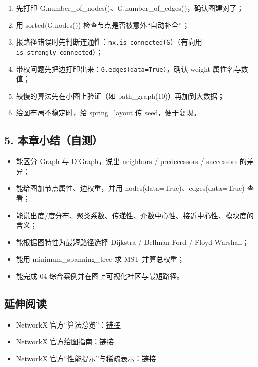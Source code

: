 \begin{enumerate}
\def\labelenumi{\arabic{enumi}.}
\tightlist
\item
  先打印 G.number\_of\_nodes()、G.number\_of\_edges()，确认图建对了；
\item
  用 sorted(G.nodes()) 检查节点是否被意外``自动补全''；
\item
  报路径错误时先判断连通性：\texttt{nx.is\_connected(G)}（有向用
  \texttt{is\_strongly\_connected}）；
\item
  带权问题先把边打印出来：\texttt{G.edges(data=True)}，确认 weight
  属性名与数值；
\item
  较慢的算法先在小图上验证（如 path\_graph(10)）再加到大数据；
\item
  绘图布局不稳定时，给 spring\_layout 传 seed，便于复现。
\end{enumerate}

\subsection{5.
本章小结（自测）}\label{ux672cux7ae0ux5c0fux7ed3ux81eaux6d4b-3}

\begin{itemize}
\tightlist
\item[$\square$]
  能区分 Graph 与 DiGraph，说出 neighbors / predecessors / successors
  的差异；
\item[$\square$]
  能给图加节点属性、边权重，并用 nodes(data=True)、edges(data=True)
  查看；
\item[$\square$]
  能说出度/度分布、聚类系数、传递性、介数中心性、接近中心性、模块度的含义；
\item[$\square$]
  能根据图特性为最短路径选择 Dijkstra / Bellman-Ford / Floyd-Warshall；
\item[$\square$]
  能用 minimum\_spanning\_tree 求 MST 并算总权重；
\item[$\square$]
  能完成 04 综合案例并在图上可视化社区与最短路径。
\end{itemize}

\subsection{延伸阅读}\label{ux5ef6ux4f38ux9605ux8bfb-30}

\begin{itemize}
\tightlist
\item
  NetworkX
  官方``算法总览''：\href{https://networkx.org/documentation/stable/reference/algorithms/index.html}{链接}
\item
  NetworkX
  官方绘图指南：\href{https://networkx.org/documentation/stable/reference/drawing.html}{链接}
\item
  NetworkX
  官方``性能提示''与稀疏表示：\href{https://networkx.org/documentation/stable/reference/convert.html}{链接}
\end{itemize}

\newpage
